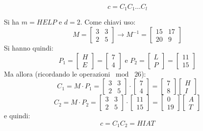 \documentclass[a4paper,12pt, oneside]{book}
\begin{document}
\[c=C_1C_1\ldots C_l\]
\begin{esempio}
  Si ha $m=HELP$ e $d=2$. Come chiavi uso:
  \[M=\left[
      \begin{matrix}
        3 & 3\\
        2 & 5
      \end{matrix}
    \right]\to M^{-1}=\left[
      \begin{matrix}
        15 & 17\\
        20 & 9
      \end{matrix}
    \right]
  \]
  Si hanno quindi:
  \[P_1=
    \left[
      \begin{matrix}
        H\\
        E
      \end{matrix}
    \right]=\left[
      \begin{matrix}
        7\\
        4
      \end{matrix}
    \right]\mbox{ e }
    P_2=\left[
      \begin{matrix}
        L\\
        P
      \end{matrix}
    \right]=\left[
      \begin{matrix}
        11\\
        15
      \end{matrix}
    \right]
  \]
  Ma allora (ricordando le operazioni $\bmod \,\,26$):
  \[C_1=M\cdot P_1=\left[
      \begin{matrix}
        3 & 3\\
        2 & 5
      \end{matrix}
    \right]\cdot\left[
      \begin{matrix}
        7\\
        4
      \end{matrix}
    \right]=\left[
      \begin{matrix}
        7\\
        8
      \end{matrix}
    \right]\left[
      \begin{matrix}
        H\\
        I
      \end{matrix}
    \right]\]
  \[C_2=M\cdot P_2=\left[
      \begin{matrix}
        3 & 3\\
        2 & 5
      \end{matrix}
    \right]\cdot\left[
      \begin{matrix}
        11\\
        15
      \end{matrix}
    \right]=\left[
      \begin{matrix}
        0\\
        19
      \end{matrix}
    \right]\left[
      \begin{matrix}
        A\\
        T
      \end{matrix}
    \right]\]
  e quindi:
  \[c=C_1C_2=HIAT\]
\end{esempio}
\end{document}
